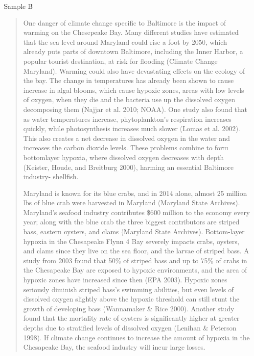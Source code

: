 \documentclass{article}\usepackage[]{graphicx}\usepackage[]{color}
\begin{document}
Sample B
\begin{quote}
One danger of climate change specific to Baltimore is the impact of warming on the Chesepeake Bay. Many different studies have estimated that the sea level around Maryland could rise a foot by 2050, which already puts parts of downtown Baltimore, including the Inner Harbor, a popular tourist destination, at risk for flooding (Climate Change Maryland). Warming could also have devastating effects on the ecology of the bay. The change in temperatures has already been shown to cause increase in algal blooms, which cause hypoxic zones, areas with low levels of oxygen, when they die and the bacteria use up the dissolved oxygen decomposing them (Najjar et al. 2010; NOAA). One study also found that as water temperatures increase, phytoplankton's respiration increases quickly, while photosynthesis increases much slower (Lomas et al. 2002). This also creates a net decrease in dissolved oxygen in the water and increases the carbon dioxide levels. These problems combine to form bottomlayer hypoxia, where dissolved oxygen decreases with depth (Keister, Houde, and Breitburg 2000), harming an essential Baltimore industry- shellfish.


Maryland is known for its blue crabs, and in 2014 alone, almost 25 million lbs of blue crab were harvested in Maryland (Maryland State Archives). Maryland's seafood industry contributes \$600 million to the economy every year; along with the blue crab the three biggest contributors are striped bass, eastern oysters, and clams (Maryland State Archives). Bottom-layer hypoxia in the Chesapeake Flynn 4 Bay severely impacts crabs, oysters, and clams since they live on the sea floor, and the larvae of striped bass. A study from 2003 found that 50\% of striped bass and up to 75\% of crabs in the Chesapeake Bay are exposed to hypoxic environments, and the area of hypoxic zones have increased since then (EPA 2003). Hypoxic zones seriously diminish striped bass's swimming abilities, but even levels of dissolved oxygen slightly above the hypoxic threshold can still stunt the growth of developing bass (Wannamaker \& Rice 2000). Another study found that the mortality rate of oysters is significantly higher at greater depths due to stratified levels of dissolved oxygen (Lenihan \& Peterson 1998). If climate change continues to increase the amount of hypoxia in the Chesapeake Bay, the seafood industry will incur large losses.

\end{quote}
\end{document}

